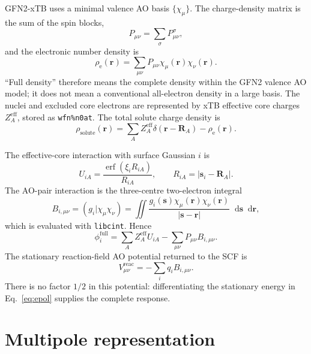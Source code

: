 \documentclass[11pt,a4paper]{article}
\newcommand{\vect}[1]{\bm{#1}}
\newcommand{\dd}{\mathop{}\!\mathrm{d}}
\newcommand{\erf}{\operatorname{erf}}
\begin{document}
GFN2-xTB uses a minimal valence AO basis $\{\chi_\mu\}$.  The charge-density
matrix is the sum of the spin blocks,
\begin{equation}
 P_{\mu\nu}=\sum_\sigma P_{\mu\nu}^{\sigma},
\end{equation}
and the electronic number density is
\begin{equation}
 \rho_{\mathrm e}(\vect r)=
 \sum_{\mu\nu}P_{\mu\nu}\chi_\mu(\vect r)\chi_\nu(\vect r).
\end{equation}
``Full density'' therefore means the complete density within the GFN2 valence
AO model; it does not mean a conventional all-electron density in a large basis.
The nuclei and excluded core electrons are represented by xTB effective core
charges $Z_A^{\mathrm{eff}}$, stored as \texttt{wfn\%n0at}.  The total solute
charge density is
\begin{equation}
 \rho_{\mathrm{solute}}(\vect r)=
 \sum_A Z_A^{\mathrm{eff}}\delta(\vect r-\vect R_A)
 -\rho_{\mathrm e}(\vect r).
\end{equation}

The effective-core interaction with surface Gaussian $i$ is
\begin{equation}
 U_{iA}=\frac{\erf(\xi_iR_{iA})}{R_{iA}},
 \qquad R_{iA}=|\vect s_i-\vect R_A|.
\end{equation}
The AO-pair interaction is the three-centre two-electron integral
\begin{equation}
 B_{i,\mu\nu}=(g_i|\chi_\mu\chi_\nu)
 =\iint\frac{g_i(\vect s)\chi_\mu(\vect r)\chi_\nu(\vect r)}
 {|\vect s-\vect r|}\dd\vect s\dd\vect r,
\end{equation}
which is evaluated with \texttt{libcint}.  Hence
\begin{equation}
 \phi_i^{\mathrm{full}}
 =\sum_A Z_A^{\mathrm{eff}}U_{iA}
 -\sum_{\mu\nu}P_{\mu\nu}B_{i,\mu\nu}.
 \label{eq:fullphi}
\end{equation}
The stationary reaction-field AO potential returned to the SCF is
\begin{equation}
 V_{\mu\nu}^{\mathrm{reac}}=-\sum_i q_iB_{i,\mu\nu}.
\end{equation}
There is no factor $1/2$ in this potential: differentiating the stationary
energy in Eq.~\eqref{eq:epol} supplies the complete response.

\section{Multipole representation}
\end{document}
